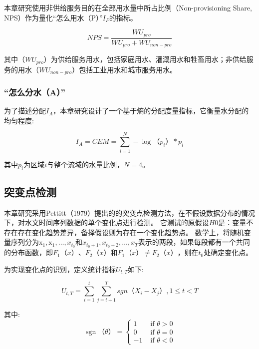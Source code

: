 本章研究使用非供给服务目的在全部用水量中所占比例（Non-provisioning Share, NPS）作为量化“怎么用水（P）”$I_P$的指标。

\begin{equation}
    NPS = \frac{WU_{pro}}{WU_{pro} + WU_{non-pro}}
\end{equation}

其中（$WU_{pro}$）为供给服务用水，包括家庭用水、灌溉用水和牲畜用水；非供给服务的用水（$WU_{non-pro}$）包括工业用水和城市服务用水。

\subsubsection*{“怎么分水（A）”}

为了描述分配$I_A$，本章研究设计了一个基于熵的分配度量指标，它衡量水分配的均匀程度:

\begin{equation}
    I_A = CEM = \sum_{i=1}^N - \log（p_{i}） * p_{i}
\end{equation}

其中$p_{i}$为区域$i$与整个流域的水量比例，$N=4$。

\subsection{突变点检测}

本章研究采用Pettitt（1979）提出的的突变点检测方法，在不假设数据分布的情况下，对水文时间序列数据的单个变化点进行检测\cite{pettitt1979}。
它测试的原假设$H0$是：变量不存在存在变化趋势差异，备择假设则为存在一个变化趋势点。
数学上，将随机变量序列分为$\mathrm{x}_{1}, \mathrm{x}_{1}, \ldots, x_{t_{0}}$和$x_{t_{0}+1}, x_{t_{0}+2}, \ldots, x_{T}$表示的两段，如果每段都有一个共同的分布函数，即$F_1（x）$、$F_2（x）$和$F_1（x） \neq F_2（x）$，则在$t_0$处确定变化点。

为实现变化点的识别，定义统计指标$U_{t,T}$如下:

\begin{equation}
    U_{t, T} = \sum_{i=1}^t\sum_{j=t+1}^T sgn（X_i - X_j）, 1 \leq t < T
\end{equation}

其中:
\begin{equation}
    \operatorname{sgn}（\theta）= \begin{cases}1 & \text { if } \theta>0 \\ 0 & \text { if } \theta=0 \\ -1 & \text { if } \theta<0\end{cases}
\end{equation}

